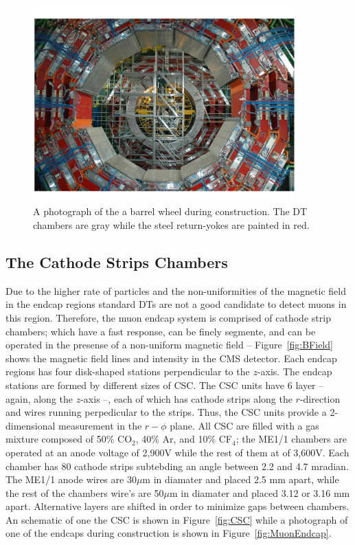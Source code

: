 \begin{figure}
 \centering
\includegraphics[width=0.9\textwidth]{CMS_DetectorFigures/MuonSystemBarrel.pdf}
\caption{A photograph of the a barrel wheel during construction. The
  DT chambers are gray while the 
  steel return-yokes are painted in red.\label{fig:BarrelWheel}}
\end{figure}
\subsection{The Cathode Strips Chambers}
Due to the higher rate of particles and the non-uniformities of the
magnetic field in the endcap regions standard DTs are not a good
candidate to detect muons in this region. Therefore, the muon endcap
system is comprised of cathode strip chambers; which have a fast
response, can be finely segmente, and can be operated in the presense
of a non-uniform magnetic field -- Figure~\ref{fig:BField} shows the
magnetic field lines and intensity in the CMS detector. Each endcap
regions has four disk-shaped stations perpendicular to the
$z$-axis. The endcap stations are formed by different sizes of
CSC. The CSC units have 6 layer -- again, along the $z$-axis --, each
of which has cathode strips along the $r$-direction and wires running
perpedicular to the strips. Thus, the CSC units provide a
2-dimensional measurement in the $r-\phi$ plane. All CSC are filled
with a gas mixture composed of 50\% CO$_{2}$, 40\% Ar, and 10\%
CF$_{4}$; the ME1/1 chambers are operated at an anode voltage of
2,900\unit{V} while the rest of them at of 3,600\unit{V}. Each chamber
has 80 cathode strips subtebding an angle between 2.2 and 4.7
mradian. The ME1/1 anode wires are 30$\mu$m in diamater and placed 2.5
mm apart, while the rest of the chambers wire's are 50$\mu$m in
diamater and placed 3.12 or 3.16
mm apart. Alternative layers are shifted in order to minimize gaps
between chambers. An schematic of one the CSC is shown in
Figure~\ref{fig:CSC} while a photograph of one of the endcaps during
construction is shown in Figure~\ref{fig:MuonEndcap}.

